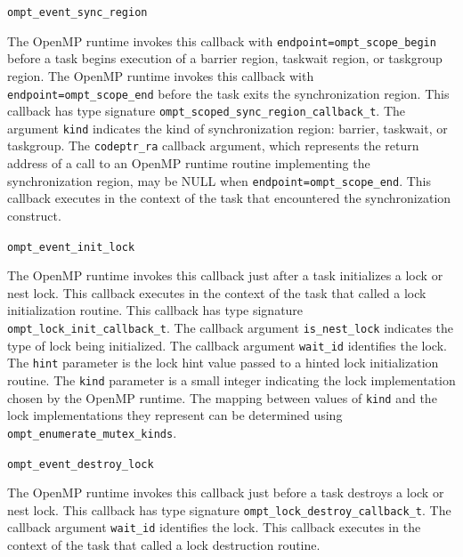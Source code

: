 \documentclass{article}
\newcommand{\descheader}[1]{{\needspace{3\baselineskip}\vspace{1em}\noindent \fbox{#1}}}
\begin{document}
\begin{description}
 
\item \verb|ompt_event_sync_region|

 \sloppy
  The OpenMP runtime invokes this callback with \verb|endpoint=|\verb|ompt_scope_begin| before a task
  begins execution of a barrier region, taskwait region, or taskgroup region. 
   The OpenMP runtime invokes this callback with \verb|endpoint=|\verb|ompt_scope_end| before the task exits the synchronization region. 
 This callback has type signature \verb|ompt_scoped_sync_region_callback_t|. 
  The argument \verb|kind| indicates the kind of synchronization region: barrier, taskwait, or taskgroup.
  The \verb|codeptr_ra| callback argument, which represents the return address of a call to an OpenMP runtime routine implementing the synchronization region,
  may be NULL when \verb|endpoint=|\verb|ompt_scope_end|.
  This callback executes in the context of the task that encountered the synchronization construct.

\end{description}

\descheader{Lock Creation and Destruction}

\begin{description}

\item \verb|ompt_event_init_lock|
 
   The OpenMP runtime invokes this callback just after a
   task initializes a lock or nest lock.  This callback executes in the
   context of the task that called a lock initialization routine.
   This callback has type signature \verb|ompt_lock_init_callback_t|. 
   The callback argument \verb|is_nest_lock| indicates the type of lock being initialized.
   The callback argument \verb|wait_id| identifies the lock. 
   The \verb|hint| parameter is the lock hint value passed to a hinted lock initialization routine.
   The \verb|kind| parameter is a small integer indicating the lock implementation chosen by the OpenMP runtime. 
   The mapping between values of \verb|kind| and the lock implementations they represent can be determined using 
   \verb|ompt_enumerate_mutex_kinds|. 

\item \verb|ompt_event_destroy_lock|
 
   The OpenMP runtime invokes this callback just before a
   task destroys a lock or nest lock.  
   This callback has type signature \verb|ompt_lock_destroy_callback_t|. 
   The callback argument \verb|wait_id| identifies the lock. 
   This callback executes in the context of the task that called a lock destruction routine.

\end{description}
\end{document}
